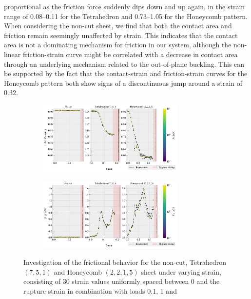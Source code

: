 proportional as the friction force suddenly dips down and up again, in the
strain range of 0.08--0.11 for the Tetrahedron and 0.73--1.05 for the Honeycomb
pattern. When considering the non-cut sheet, we find that both the contact area
and friction remain seemingly unaffected by strain. This indicates that the
contact area is not a dominating mechanism for friction in our system, although
the non-linear friction-strain curve might be correlated with a decrease in
contact area through an underlying mechanism related to the out-of-plane
buckling. This can be supported by the fact that the contact-strain and
friction-strain curves for the Honeycomb pattern both show signs of a
discontinuous jump around a strain of 0.32. 


\begin{figure}[H]
  \centering
  \begin{subfigure}[t]{\textwidth}
      \centering
      \includegraphics[width=0.8\textwidth]{figures/baseline/multi_stretch_area_compare.pdf}
      \caption{}
      \label{fig:multi_stretch_contact}
  \end{subfigure}
  \hfill
  \begin{subfigure}[t]{\textwidth}
      \centering
      \includegraphics[width=0.8\textwidth]{figures/baseline/multi_stretch_mean_compare.pdf}
      \caption{}
      \label{fig:multi_stretch_mean_fric}
  \end{subfigure}
  \hfill
     \caption{Investigation of the frictional behavior for the non-cut, Tetrahedron $(7,5,1)$ and Honeycomb $(2,2,1,5)$ sheet under varying strain, consisting of 30 strain values uniformly spaced between 0 and the rupture strain in combination with loads 0.1, 1 and
}
\end{figure}
